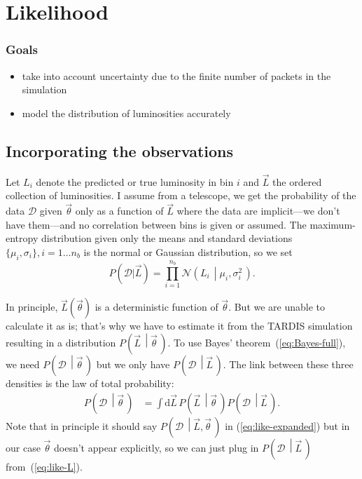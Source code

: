 \documentclass[a4,12pt]{article}
\newcommand{\data}{\ensuremath{\mathcal{D}}}
\newcommand{\expin}{\ensuremath{\lbrace\mu_i, \sigma_i\rbrace}}
\newcommand{\given}[2]{\left(#1\, \middle| #2 \, \right)}
\newcommand{\gaussian}{\ensuremath{\mathcal{N}}}
\newcommand{\Lumi}{\ensuremath{L_i}}
\newcommand{\rmdx}[1]{\mbox{d} #1 \,} %
\newcommand{\vecL}{\ensuremath{\vec{L}}}
\newcommand{\vecth}{\ensuremath{{\vec{\theta}}}}
\def \refeq#1{(\ref{eq:#1})}
\newcommand{\tardis}{TARDIS}
\begin{document}

\section{Likelihood}

\subsubsection*{Goals}
\begin{itemize}
\item take into account uncertainty due to the finite number of packets in the simulation
\item model the distribution of luminosities accurately
\end{itemize}

\subsection{Incorporating the observations}

Let \Lumi{} denote the predicted or true luminosity in bin $i$ and
$\vecL$ the ordered collection of luminosities. I assume from a
telescope, we get the probability of the data $\mathcal{D}$ given
$\vecth$ only as a function of $\vecL$ where the data are
implicit---we don't have them---and no correlation between bins is
given or assumed. The maximum-entropy distribution given only the
means and standard deviations $\expin, i=1\dots n_b$ is the normal or
Gaussian distribution, so we set
\begin{equation}
  \label{eq:like-L}
  P(\mathcal{D} | \vecL) = \prod_{i=1}^{n_b} \gaussian\given{\Lumi}{\mu_i, \sigma_i^2}.
\end{equation}

In principle, $\vecL(\vecth)$ is a deterministic function of
$\vecth$. But we are unable to calculate it as is; that's why we have
to estimate it from the \tardis{} simulation resulting in a
distribution $P\given{\vecL}{\vecth}$. To use Bayes'
theorem~\refeq{Bayes-full}, we need $P\given{\data}{\vecth}$ but we
only have $P\given{\data}{\vecL}$. The link between these three
densities is the law of total probability:
\begin{align}
  \label{eq:like-expanded}
  P\given{\data}{\vecth} &= \int \rmdx{\vecL} P\given{\vecL}{\vecth} P\given{\data}{\vecL}.
\end{align}
Note that in principle it should say $P\given{\data}{\vecL, \vecth}$
in \refeq{like-expanded} but in our case $\vecth$ doesn't appear
explicitly, so we can just plug in
$P\given{\data}{\vecL}$ from~\refeq{like-L}.
\end{document}

